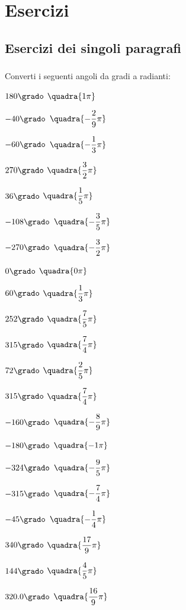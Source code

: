 
\section{Esercizi}

\subsection{Esercizi dei singoli paragrafi}

\subsubsection*{}

\begin{esercizio}\label{ese:gonio.1}
 Converti i seguenti angoli da gradi a radianti:
\begin{multicols}{3}
 \begin{enumeratea}
  \item  $180\grado$
   \hfill $\quadra{1\pi}$
  \item  $-40\grado$
   \hfill $\quadra{-\dfrac{2}{9}\pi}$
  \item  $-60\grado$
   \hfill $\quadra{-\dfrac{1}{3}\pi}$
  \item  $270\grado$
   \hfill $\quadra{\dfrac{3}{2}\pi}$
  \item  $36\grado$
   \hfill $\quadra{\dfrac{1}{5}\pi}$
  \item  $-108\grado$
   \hfill $\quadra{-\dfrac{3}{5}\pi}$
  \item  $-270\grado$
   \hfill $\quadra{-\dfrac{3}{2}\pi}$
  \item  $0\grado$
   \hfill $\quadra{0\pi}$
  \item  $60\grado$
   \hfill $\quadra{\dfrac{1}{3}\pi}$
  \item  $252\grado$
   \hfill $\quadra{\dfrac{7}{5}\pi}$
  \item  $315\grado$
   \hfill $\quadra{\dfrac{7}{4}\pi}$
  \item  $72\grado$
   \hfill $\quadra{\dfrac{2}{5}\pi}$
  \item  $315\grado$
   \hfill $\quadra{\dfrac{7}{4}\pi}$
  \item  $-160\grado$
   \hfill $\quadra{-\dfrac{8}{9}\pi}$
  \item  $-180\grado$
   \hfill $\quadra{-1\pi}$
  \item  $-324\grado$
   \hfill $\quadra{-\dfrac{9}{5}\pi}$
  \item  $-315\grado$
   \hfill $\quadra{-\dfrac{7}{4}\pi}$
  \item  $-45\grado$
   \hfill $\quadra{-\dfrac{1}{4}\pi}$
  \item  $340\grado$
   \hfill $\quadra{\dfrac{17}{9}\pi}$
  \item  $144\grado$
   \hfill $\quadra{\dfrac{4}{5}\pi}$
  \item  $320.0\grado$
   \hfill $\quadra{\dfrac{16}{9}\pi}$
 \end{enumeratea}
\end{multicols}
\end{esercizio}

